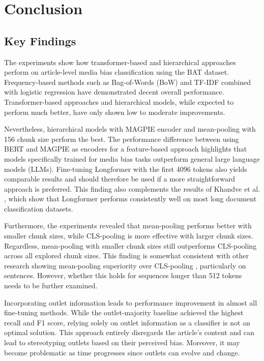 \chapter{Conclusion}
\label{cha:6}

\section{Key Findings}

The experiments show how transformer-based and hierarchical approaches perform on article-level media bias classification using the BAT dataset. Frequency-based methods such as Bag-of-Words (BoW) and TF-IDF combined with logistic regression have demonstrated decent overall performance. Transformer-based approaches and hierarchical models, while expected to perform much better, have only shown low to moderate improvements.

Nevertheless, hierarchical models with MAGPIE encoder and mean-pooling with 156 chunk size perform the best. The performance difference between using BERT and MAGPIE as encoders for a feature-based approach highlights that models specifically trained for media bias tasks outperform general large language models (LLMs). Fine-tuning Longformer with the first 4096 tokens also yields comparable results and should therefore be used if a more straightforward approach is preferred. This finding also complements the results of Khandve et al. \cite{khandve-2022-hierarchical-longdoc}, which show that Longformer performs consistently well on most long document classification datasets.

Furthermore, the experiments revealed that mean-pooling performs better with smaller chunk sizes, while CLS-pooling is more effective with larger chunk sizes. Regardless, mean-pooling with smaller chunk sizes still outperforms CLS-pooling across all explored chunk sizes. This finding is somewhat consistent with other research showing mean-pooling superiority over CLS-pooling \cite{rodrigo-2024-systematic-review-media-bias,reimers-2019-sentencebert}, particularly on sentences. However, whether this holds for sequences longer than 512 tokens needs to be further examined.

Incorporating outlet information leads to performance improvement in almost all fine-tuning methods. While the outlet-majority baseline achieved the highest recall and F1 score, relying solely on outlet information as a classifier is not an optimal solution. This approach entirely disregards the article's content and can lead to stereotyping outlets based on their perceived bias. Moreover, it may become problematic as time progresses since outlets can evolve and change.

